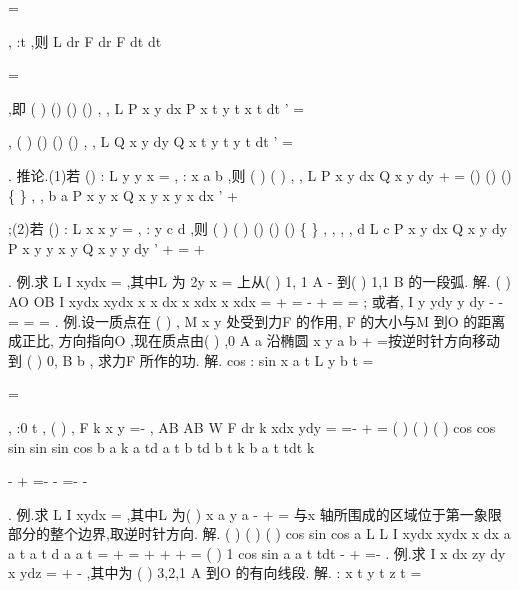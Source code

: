 =

, :t \alpha 
\beta 
\to 
,则
L
dr
F dr
F
dt
dt
\beta 
\alpha 


\cdots 
=
\cdots 




\int 
\int 
\rho 
\rho 
\rho 
\rho 
,即 
(
)
()
()
()
,
,
L
P x y dx
P x t
y t
x t dt
\beta 
\alpha 
'
=




\int 
\int 
,
(
)
()
()
()
,
,
L
Q x y dy
Q x t
y t
y t dt
\beta 
\alpha 
'
=




\int 
\int 
. 
\textcolor{lyred}{推论}.(1)若
()
:
L y
y x
=
,
:
x a
b
\to 
,则
(
)
(
)
,
,
L
P x y dx
Q x y dy
+
=
\int 
()
()
()
\{
\}
,
,
b
a
P x y x
Q x y x
y
x
dx
'
+








\int 
;(2)若
()
:
L x
x y
=
,
:
y c
d
\to 
,则 
(
)
(
)
()
()
()
\{
\}
,
,
,
,
d
L
c
P x y dx
Q x y dy
P x y
y x
y
Q x y
y
dy
'
+
=
+








\int 
\int 
. 
\textcolor{lyred}{例}.求
L
I
xydx
=\int 
,其中L 为
2y
x
=
上从(
)
1, 1
A
-
到(
)
1,1
B
的一段弧. 
解.
\approx 
\approx 
(
)
AO
OB
I
xydx
xydx
x
x dx
x xdx
x xdx
=
+
=
-
+
=
=
\int 
\int 
\int 
\int 
\int 
; 
或者,
I
y ydy
y dy
-
-
=
=
=
\int 
\int 
. 
\textcolor{lyred}{例}.设一质点在
(
)
,
M x y 处受到力F
\xi \rho 
的作用, F
\xi \rho 
的大小与M 到O 的距离成正比, 
方向指向O ,现在质点由(
)
,0
A a
沿椭圆
x
y
a
b
+
=按逆时针方向移动到
(
)
0,
B
b , 
求力F
\xi \rho 
所作的功. 
解.
cos
:
sin
x
a
t
L
y
b
t
=


=

, :0
t
\pi 
\to 
,
(
)
,
F
k x y
=-
\rho 
,
\approx 
\approx 
AB
AB
W
F dr
k
xdx
ydy
=
\cdots 
=-
+
=
\int 
\int 
\rho 
\rho 
(
)
(
)
(
)
cos
cos
sin
sin
sin cos
b
a
k a
td a
t
b
td b
t
k b
a
t
tdt
k
\pi 
\pi 


-
+
=-
-
=-
-




\int 
\int 
. 
\textcolor{lyred}{例}.求
L
I
xydx
=\int \nabla 
,其中L 为(
)
x
a
y
a
-
+
=
与x 轴所围成的区域位于第一象限 
部分的整个边界,取逆时针方向. 
解.
(
)
(
)
(
)
cos
sin
cos
a
L
L
I
xydx
xydx
x
dx
a
a
t a
t d a
a
t
\pi 
=
+
=
\cdots 
+
+
\cdots 
+
=
\int 
\int 
\int 
\int 
(
)
1 cos
sin
a
a
t
tdt
\pi 
\pi 
-
+
=-
\int 
. 
\textcolor{lyred}{例}.求
I
x dx
zy dy
x ydz
\Gamma 
=
+
-
\int 
,其中\Gamma 为
(
)
3,2,1
A
到O 的有向线段. 
解.
:
x
t
y
t
z
t
=


